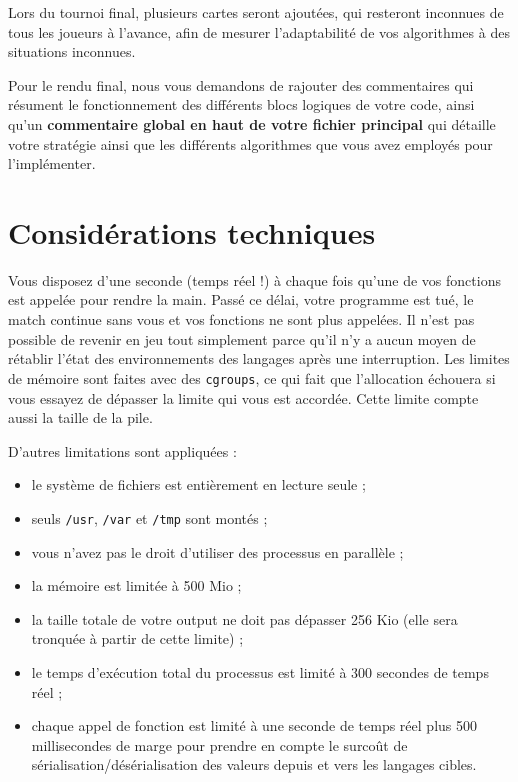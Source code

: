 Lors du tournoi final, plusieurs cartes seront ajoutées, qui resteront
inconnues de tous les joueurs à l'avance, afin de mesurer l'adaptabilité de
vos algorithmes à des situations inconnues.

Pour le rendu final, nous vous demandons de rajouter des commentaires qui
résument le fonctionnement des différents blocs logiques de votre code, ainsi
qu'un \textbf{commentaire global en haut de votre fichier principal} qui
détaille votre stratégie ainsi que les différents algorithmes que vous avez
employés pour l'implémenter.

\section{Considérations techniques}

Vous disposez d'une seconde (temps réel !) à chaque fois qu'une de vos
fonctions est appelée pour rendre la main. Passé ce délai, votre programme est
tué, le match continue sans vous et vos fonctions ne sont plus appelées. Il
n'est pas possible de revenir en jeu tout simplement parce qu'il n'y a aucun
moyen de rétablir l'état des environnements des langages après une
interruption.  Les limites de mémoire sont faites avec des \texttt{cgroups}, ce
qui fait que l'allocation échouera si vous essayez de dépasser la limite qui
vous est accordée. Cette limite compte aussi la taille de la pile.

D'autres limitations sont appliquées :

\begin{itemize}
    \item le système de fichiers est entièrement en lecture seule ;
    \item seuls \texttt{/usr}, \texttt{/var} et \texttt{/tmp} sont montés ;
    \item vous n'avez pas le droit d'utiliser des processus en parallèle ;
    \item la mémoire est limitée à 500 Mio ;
    \item la taille totale de votre output ne doit pas dépasser 256 Kio (elle
        sera tronquée à partir de cette limite) ;
    \item le temps d'exécution total du processus est limité à 300 secondes de
        temps réel ;
    \item chaque appel de fonction est limité à une seconde de temps réel plus
        500 millisecondes de marge pour prendre en compte le surcoût de
        sérialisation/désérialisation des valeurs depuis et vers les langages
        cibles.
\end{itemize}
